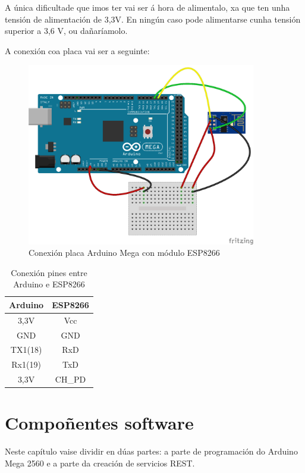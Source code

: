 \documentclass[11pt,twoside]{book}
\begin{document}
A única dificultade que imos ter vai ser á hora de alimentalo, xa que ten unha tensión de alimentación de 3,3V. En ningún caso pode alimentarse cunha tensión superior a 3,6 V, ou dañaríamolo.

A conexión coa placa vai ser a seguinte:

\begin{figure}[H]
	\begin{center}
		\includegraphics[width=10cm]{images/conexionArduinoESP8266_WiFiEsp.png}
	\end{center}
	\caption{Conexión placa Arduino Mega con módulo ESP8266}
	\label{fig:ConexionESP8266}
\end{figure}

\begin{table}[htbt]
\begin{center}
\begin{tabular}{|c|c|}
\hline
Arduino & ESP8266 \\
\hline
3,3V & Vcc \\
\hline
GND & GND \\
\hline
TX1(18) & RxD \\
\hline
Rx1(19) & TxD \\
\hline
3,3V & CH\_PD \\
\hline
\end{tabular}
\caption{Conexión pines entre Arduino e ESP8266}
\label{TablaArduinoESP8266_WiFiEsp}
\end{center}
\end{table}

\chapter{Compoñentes software}

Neste capítulo vaise dividir en dúas partes: a parte de programación do Arduino Mega 2560 e a parte da creación de servicios REST.
\end{document}
